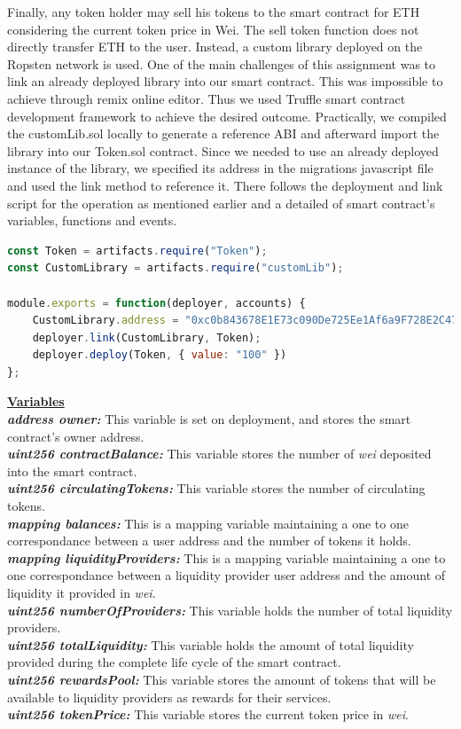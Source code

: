 \documentclass[12pt,a4paper]{article}
\begin{document}
Finally, any token holder may sell his tokens to the smart contract for ETH
considering the current token price in Wei. The sell token function does not
directly transfer ETH to the user. Instead, a custom library deployed on the
Ropsten network is used. One of the main challenges of this assignment was to
link an already deployed library into our smart contract. This was impossible to
achieve through remix online editor. Thus we used Truffle smart contract
development framework to achieve the desired outcome. Practically, we compiled
the customLib.sol locally to generate a reference ABI and afterward import the
library into our Token.sol contract. Since we needed to use an already deployed
instance of the library, we specified its address in the migrations javascript
file and used the link method to reference it. There follows the deployment and
link script for the operation as mentioned earlier and a detailed of smart
contract's variables, functions and events. \\

\begin{lstlisting}[language=JavaScript]
const Token = artifacts.require("Token");
const CustomLibrary = artifacts.require("customLib");

module.exports = function(deployer, accounts) {
    CustomLibrary.address = "0xc0b843678E1E73c090De725Ee1Af6a9F728E2C47"
    deployer.link(CustomLibrary, Token);
    deployer.deploy(Token, { value: "100" })
};
\end{lstlisting}

\textbf{\underline{Variables}} \\

\textbf{\emph{address owner:}} This variable is set on deployment, and stores the smart
contract's owner address.\\
\textbf{\emph{uint256 contractBalance:}} This variable stores the number of \emph{wei} deposited
into the smart contract.\\
\textbf{\emph{uint256 circulatingTokens:}}  This variable stores the number of
circulating tokens.\\
\textbf{\emph{mapping balances:}} This is a mapping variable maintaining a one to one
correspondance between a user address and the number of tokens it holds. \\
\textbf{\emph{mapping liquidityProviders:}} This is a mapping variable maintaining a one
to one correspondance between a liquidity provider user address and the amount
of liquidity it provided in \emph{wei}. \\
\textbf{\emph{uint256 numberOfProviders:}} This variable holds the number of total
liquidity providers.\\
\textbf{\emph{uint256 totalLiquidity:}} This variable holds the amount of total liquidity
provided during the complete life cycle of the smart contract.\\
\textbf{\emph{uint256 rewardsPool:}} This variable stores the amount of tokens that will
be available to liquidity providers as rewards for their services.\\
\textbf{\emph{uint256 tokenPrice:}} This variable stores the current token price in
\emph{wei}.\\
\end{document}
